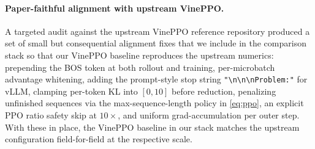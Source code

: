 \documentclass[11pt]{article}
\newcommand{\vineppo}{VinePPO}
\begin{document}
\paragraph{Paper-faithful alignment with upstream \vineppo{}.}
A targeted audit against the upstream \vineppo{} reference repository
\citep{vineppocode} produced a set of small but consequential alignment
fixes that we include in the comparison stack so that our \vineppo{}
baseline reproduces the upstream numerics:
prepending the BOS token at both rollout and training,
per-microbatch advantage whitening,
adding the prompt-style stop string \texttt{"\textbackslash n\textbackslash n\textbackslash nProblem:"} for vLLM,
clamping per-token KL into $[0,10]$ before reduction,
penalizing unfinished sequences via the max-sequence-length policy in
\eqref{eq:ppo}, an explicit PPO ratio safety skip at $10\times$,
and uniform grad-accumulation per outer step. With these in place,
the \vineppo{} baseline in our stack matches the upstream
configuration field-for-field at the respective scale.
\end{document}
